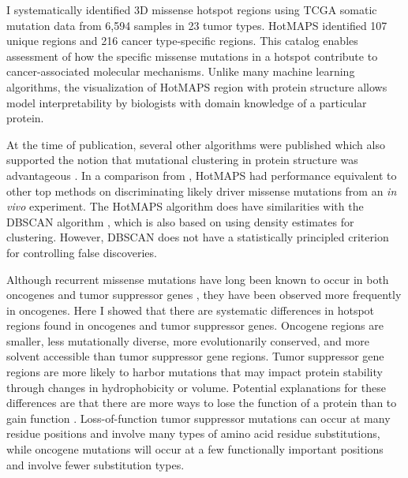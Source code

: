 I systematically identified 3D missense hotspot regions using TCGA somatic mutation data from 6,594 samples in 23 tumor types. HotMAPS identified 107 unique regions and 216 cancer type-specific regions. This catalog enables assessment of how the specific missense mutations in a hotspot contribute to cancer-associated molecular mechanisms. Unlike many machine learning algorithms, the visualization of HotMAPS region with protein structure allows model interpretability by biologists with domain knowledge of a particular protein.

At the time of publication, several other algorithms were published which also supported the notion that mutational clustering in protein structure was advantageous \cite{RN133, RN131, RN132}. In a comparison from \cite{RN133}, HotMAPS had performance equivalent to other top methods on discriminating likely driver missense mutations from an \textit{in vivo} experiment. The HotMAPS algorithm does have similarities with the DBSCAN algorithm \cite{RN117}, which is also based on using density estimates for clustering. However, DBSCAN does not have a statistically principled criterion for controlling false discoveries. 

Although recurrent missense mutations have long been known to occur in both oncogenes and tumor suppressor genes \cite{RN107}, they have been observed more frequently in oncogenes. Here I showed that there are systematic differences in hotspot regions found in oncogenes and tumor suppressor genes. Oncogene regions are smaller, less mutationally diverse, more evolutionarily conserved, and more solvent accessible than tumor suppressor gene regions. Tumor suppressor gene regions are more likely to harbor mutations that may impact protein stability through changes in hydrophobicity or volume. Potential explanations for these differences are that there are more ways to lose the function of a protein than to gain function \cite{RN130}. Loss-of-function tumor suppressor mutations can occur at many residue positions and involve many types of amino acid residue substitutions, while oncogene mutations will occur at a few functionally important positions and involve fewer substitution types.

